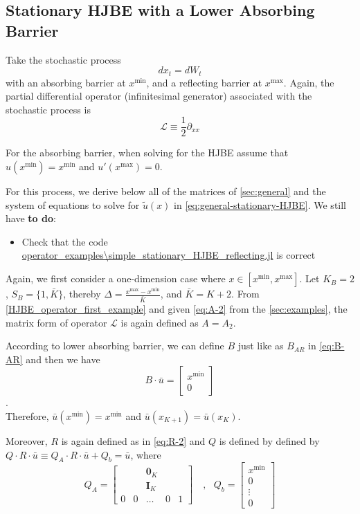 \documentclass[11pt]{article}
\newcommand{\D}[1][]{\ensuremath{\partial_{#1}}}
\begin{document}
\subsection{Stationary HJBE with a Lower Absorbing Barrier}
Take the stochastic process
$$
d x_t = d W_t
$$
with an absorbing barrier at $x^{\min}$, and a reflecting barrier at $x^{\max}$. Again, the partial differential operator (infinitesimal generator) associated with the stochastic process is
$$
\mathcal{L} \equiv \frac{1}{2}\D[xx]
$$

For the absorbing barrier, when solving for the HJBE assume that $u(x^{\min}) = x^{\min}$ and $u'(x^{\max}) = 0$. 

For this process, we derive below all of the matrices of \cref{sec:general} and the system of equations to solve for $\tilde{u}(x)$ in \cref{eq:general-stationary-HJBE}. We still have \textbf{to do}:
\begin{itemize}
	\item Check that the code \url{operator_examples\simple_stationary_HJBE_reflecting.jl} is correct
\end{itemize}

Again, we first consider a one-dimension case where $x\in [x^{\min},x^{\max}]$. Let $K_B = 2$, $S_B = \{1,\bar{K}\}$, thereby $\Delta  = \frac{x^{\max}-x^{\min}}{\bar{K}}$, and $\bar{K} = K+2$. From \eqref{HJBE_operator_first_example} and given \eqref{eq:A-2} from the \cref{sec:examples}, the matrix form of operator $\mathcal{L}$ is again defined as $A = A_2$.

According to lower absorbing barrier, we can define $B$ just like as $B_{AR}$ in \eqref{eq:B-AR} and then we have
\begin{equation}
B\cdot\bar{u} = \begin{bmatrix}
x^{\min}\\
0
\end{bmatrix}
\end{equation}.\\
Therefore, $\bar{u}(x^{\min}) = x^{\min}$ and $\bar{u}(x_{K+1}) = \bar{u}(x_K)$.

Moreover, $R$ is again defined as in \eqref{eq:R-2} and $Q$ is defined by defined by $Q\cdot R\cdot\bar{u}\equiv Q_A\cdot R\cdot\bar{u}+Q_b = \bar{u}$, where
\begin{equation}
Q_A = \begin{bmatrix}
& & \mathbf{0}_K & & \\
& & \mathbf{I}_K & & \\
0&0&\dots&0&1
\end{bmatrix}%
\quad, \text{ } Q_b = \begin{bmatrix}
x^{\min}\\
0\\
\vdots\\
0
\end{bmatrix}%
\end{equation}
\end{document}
